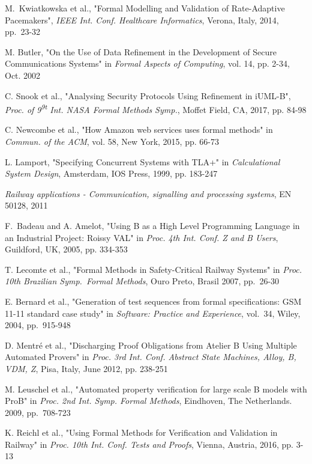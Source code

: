 \documentclass[12pt,journal,duplex]{IEEEtran}
\begin{document}
\begin{thebibliography}{2}
		M.~Kwiatkowska et al., "Formal Modelling and Validation of Rate-Adaptive Pacemakers", \emph{IEEE Int. Conf. Healthcare Informatics}, Verona, Italy, 2014, pp.~23-32

		M. Butler, "On the Use of Data Refinement in the Development of Secure Communications Systems" in \emph{Formal Aspects of Computing}, vol. 14, pp. 2-34, Oct. 2002

		C. Snook et al., "Analysing Security Protocols Using Refinement in iUML-B", \emph{Proc. of 9\textsuperscript{9t} Int. NASA Formal Methods Symp.}, Moffet Field, CA, 2017, pp. 84-98

		C. Newcombe et al., "How Amazon web services uses formal methods" in \emph{Commun. of the ACM}, vol. 58, New York, 2015, pp. 66-73

		L. Lamport, "Specifying Concurrent Systems with TLA+" in \emph{Calculational System Design}, Amsterdam, IOS Press, 1999, pp. 183-247

		\emph{Railway applications - Communication, signalling and processing systems}, EN 50128, 2011

		F.~Badeau and A. Amelot, "Using B as a High Level Programming Language in an Industrial Project: Roissy VAL" in \emph{Proc. 4th Int. Conf. Z and B Users}, Guildford, UK, 2005, pp. 334-353

		T. Lecomte et al., "Formal Methods in Safety-Critical Railway Systems" in \emph{Proc. 10th Brazilian Symp.~Formal Methods}, Ouro Preto, Brasil 2007, pp.~26-30
		
		E. Bernard et al., "Generation of test sequences from formal specifications: GSM 11-11 standard case study" in \emph{Software: Practice and Experience}, vol.~34, Wiley, 2004, pp.~915-948
		
		D. Mentr\'{e} et al., "Discharging Proof Obligations from Atelier B Using Multiple Automated Provers" in \emph{Proc. 3rd Int. Conf. Abstract State Machines, Alloy, B, VDM, Z}, Pisa, Italy, June 2012, pp. 238-251
		
		M. Leuschel et al., "Automated property verification for large scale B models with ProB" in \emph{Proc. 2nd Int. Symp. Formal Methods}, Eindhoven, The Netherlands. 2009, pp.~708-723

		K. Reichl et al., "Using Formal Methods for Verification and Validation in Railway" in \emph{Proc. 10th Int. Conf. Tests and Proofs}, Vienna, Austria, 2016, pp. 3-13


\end{thebibliography}
\end{document}
